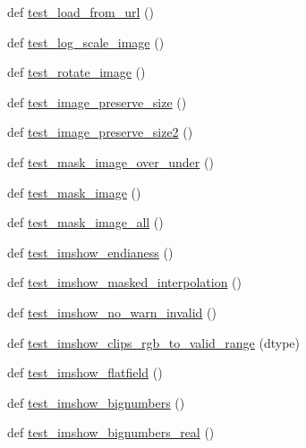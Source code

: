 \begin{DoxyCompactItemize}
def \hyperlink{namespacematplotlib_1_1tests_1_1test__image_a214abea207169a6a8e7c0918054ae2e3}{test\+\_\+load\+\_\+from\+\_\+url} ()
\item 
def \hyperlink{namespacematplotlib_1_1tests_1_1test__image_aa0c717ff3d91b10c55be7d19b1b8b53e}{test\+\_\+log\+\_\+scale\+\_\+image} ()
\item 
def \hyperlink{namespacematplotlib_1_1tests_1_1test__image_ae31b081f90350544c29d44a069adc30b}{test\+\_\+rotate\+\_\+image} ()
\item 
def \hyperlink{namespacematplotlib_1_1tests_1_1test__image_a63548d519c17b4902acad769eff2590e}{test\+\_\+image\+\_\+preserve\+\_\+size} ()
\item 
def \hyperlink{namespacematplotlib_1_1tests_1_1test__image_aa0784b37d3d80c0634b2406e52bf8fef}{test\+\_\+image\+\_\+preserve\+\_\+size2} ()
\item 
def \hyperlink{namespacematplotlib_1_1tests_1_1test__image_a3396147e8f6aa3e6ae838302e8e6cc18}{test\+\_\+mask\+\_\+image\+\_\+over\+\_\+under} ()
\item 
def \hyperlink{namespacematplotlib_1_1tests_1_1test__image_ab60cd27767f390675fc406d31e227776}{test\+\_\+mask\+\_\+image} ()
\item 
def \hyperlink{namespacematplotlib_1_1tests_1_1test__image_a13a30777bc18fa1a89026edabf3fbee3}{test\+\_\+mask\+\_\+image\+\_\+all} ()
\item 
def \hyperlink{namespacematplotlib_1_1tests_1_1test__image_aec8e460484d50ecb6291098f9c9e583a}{test\+\_\+imshow\+\_\+endianess} ()
\item 
def \hyperlink{namespacematplotlib_1_1tests_1_1test__image_a2cb1447690926c3efa6a646746304819}{test\+\_\+imshow\+\_\+masked\+\_\+interpolation} ()
\item 
def \hyperlink{namespacematplotlib_1_1tests_1_1test__image_ae2c47f447525aec15d24aa23753f6bcb}{test\+\_\+imshow\+\_\+no\+\_\+warn\+\_\+invalid} ()
\item 
def \hyperlink{namespacematplotlib_1_1tests_1_1test__image_a2b43d21d6c0fb6828964135f710bf4a9}{test\+\_\+imshow\+\_\+clips\+\_\+rgb\+\_\+to\+\_\+valid\+\_\+range} (dtype)
\item 
def \hyperlink{namespacematplotlib_1_1tests_1_1test__image_a8e56087dfe33f9640efe2088860bead1}{test\+\_\+imshow\+\_\+flatfield} ()
\item 
def \hyperlink{namespacematplotlib_1_1tests_1_1test__image_a2789426ef7ce6150e8fe624a55c0f68f}{test\+\_\+imshow\+\_\+bignumbers} ()
\item 
def \hyperlink{namespacematplotlib_1_1tests_1_1test__image_a5971fa47110373afd2f9936fd5ece2eb}{test\+\_\+imshow\+\_\+bignumbers\+\_\+real} ()

\end{DoxyCompactItemize}
